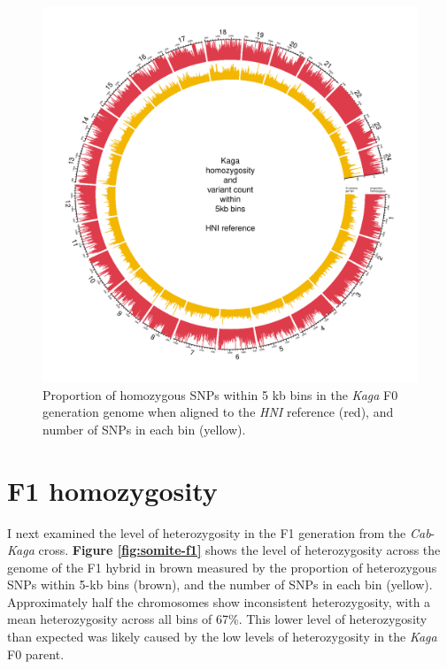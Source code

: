\documentclass[
]{book}
\begin{document}
\begin{figure}
\includegraphics[width=1\linewidth]{figs/somites/Kaga_HNI} \caption{Proportion of homozygous SNPs within 5 kb bins in the \emph{Kaga} F0 generation genome when aligned to the \emph{HNI} reference (red), and number of SNPs in each bin (yellow).}\label{fig:somite-f0-kaga-hni}
\end{figure}

\hypertarget{f1-homozygosity}{%
\section{F1 homozygosity}\label{f1-homozygosity}}

I next examined the level of heterozygosity in the F1 generation from the \emph{Cab}-\emph{Kaga} cross. \textbf{Figure \ref{fig:somite-f1}} shows the level of heterozygosity across the genome of the F1 hybrid in brown measured by the proportion of heterozygous SNPs within 5-kb bins (brown), and the number of SNPs in each bin (yellow). Approximately half the chromosomes show inconsistent heterozygosity, with a mean heterozygosity across all bins of 67\%. This lower level of heterozygosity than expected was likely caused by the low levels of heterozygosity in the \emph{Kaga} F0 parent.
\end{document}
